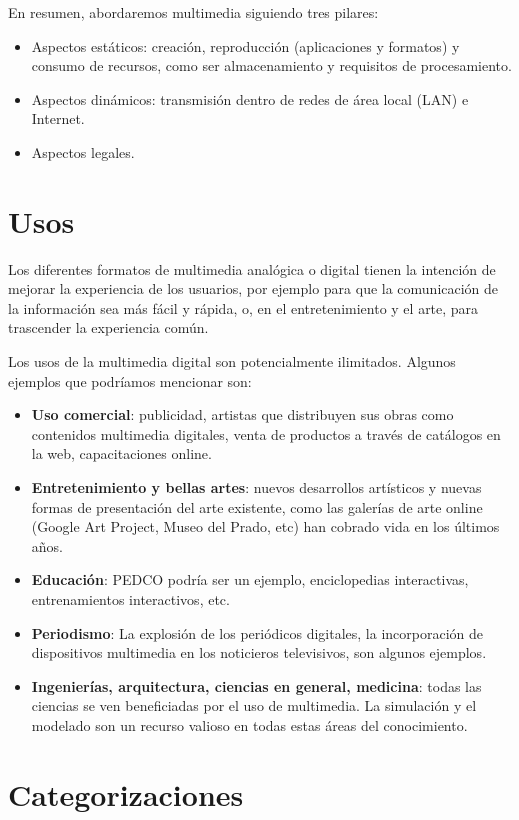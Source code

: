 \documentclass[12pt]{article}
\begin{document}
En resumen, abordaremos multimedia siguiendo tres pilares:
\begin{itemize}
\item Aspectos estáticos: creación, reproducción (aplicaciones y formatos) y 
consumo de recursos, como ser almacenamiento y requisitos de procesamiento. 
\item Aspectos dinámicos: transmisión dentro de redes de área local (LAN) e 
Internet. 
\item Aspectos legales.  
\end{itemize}

\section*{Usos}

Los diferentes formatos de multimedia analógica o digital tienen la 
intención de mejorar la experiencia de los usuarios, por ejemplo para 
que la comunicación de la información sea más fácil y rápida, o, en 
el entretenimiento y el arte, para trascender la experiencia común.\cite{wikipmmes} 

Los usos de la multimedia digital son potencialmente ilimitados. Algunos 
ejemplos que podríamos mencionar son:  

\begin{itemize}
\item {\bf Uso comercial}: publicidad, artistas que distribuyen sus obras como contenidos 
multimedia digitales, venta de productos a través de catálogos en la web, capacitaciones online. 
\item {\bf Entretenimiento y bellas artes}: nuevos desarrollos artísticos y nuevas formas 
de presentación del arte existente, como las galerías de arte online (Google Art Project, 
Museo del Prado, etc) han cobrado vida en los últimos años.  
\item {\bf Educación}: PEDCO podría ser un ejemplo, enciclopedias interactivas, entrenamientos
interactivos, etc. 
\item {\bf Periodismo}: La explosión de los periódicos digitales, la incorporación de dispositivos 
multimedia en los noticieros televisivos, son algunos ejemplos. 
\item {\bf Ingenierías, arquitectura, ciencias en general, medicina}: todas las ciencias se ven 
beneficiadas por el uso de multimedia. La simulación y el modelado son un recurso 
valioso en todas estas áreas del conocimiento. 
\end{itemize}


\section*{Categorizaciones}
\end{document}
